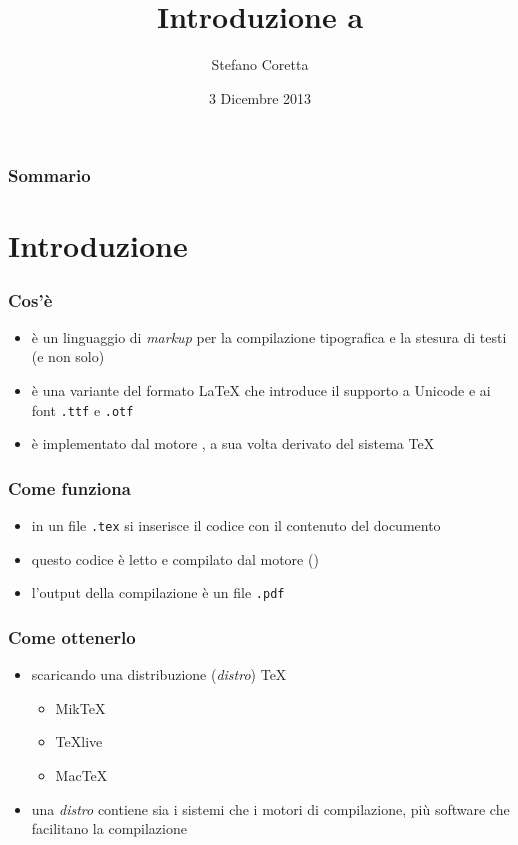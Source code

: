 \documentclass{beamer}
\title{Introduzione a \XeLaTeX}
\author{Stefano Coretta}
\date{3 Dicembre 2013}
\begin{document}
\begin{frame}
	\maketitle
\end{frame}

\begin{frame}
	\frametitle{Sommario}
	\tableofcontents
\end{frame}

\section{Introduzione}

\begin{frame}
	\frametitle{Cos'è \XeLaTeX}
	
\begin{itemize}
\item è un linguaggio di \textit{markup} per la compilazione tipografica e la stesura di testi (e non solo)
\item è una variante del formato \LaTeX{} che introduce il supporto a Unicode e ai font \texttt{.ttf} e \texttt{.otf}
\item è implementato dal motore \XeTeX, a sua volta derivato del sistema \TeX
\end{itemize}

\end{frame}

\begin{frame}
	\frametitle{Come funziona}
	
\begin{itemize}
\item in un file \texttt{.tex} si inserisce il codice con il contenuto del documento
\item questo codice è letto e compilato dal motore (\XeLaTeX)
\item l'output della compilazione è un file \texttt{.pdf}
\end{itemize}

\end{frame}

\begin{frame}
	\frametitle{Come ottenerlo}
	
\begin{itemize}
\item scaricando una distribuzione (\textit{distro}) \TeX
\begin{itemize}
\item MikTeX
\item TeXlive 
\item MacTeX
\end{itemize}
\item una \textit{distro} contiene sia i sistemi che i motori di compilazione, più software che facilitano la compilazione
\end{itemize}

\end{frame}
\end{document}

